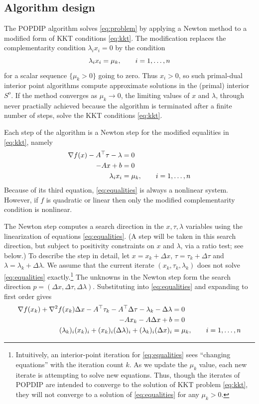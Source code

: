 \documentclass[11pt]{article}
\newcommand{\grad}{\nabla}
\begin{document}
\subsection*{Algorithm design}

The POPDIP algorithm solves \eqref{eq:problem} by applying a Newton method to a modified form of KKT conditions \eqref{eq:kkt}.  The modification replaces the complementarity condition $\lambda_i x_i = 0$ by the condition
\begin{equation}
\lambda_i x_i = \mu_k, \qquad i=1,\dots,n \notag \\
\end{equation}
for a scalar sequence $\{\mu_k>0\}$ going to zero.  Thus $x_i>0$, so such primal-dual interior point algorithms \cite{NocedalWright2006} compute approximate solutions in the (primal) interior $S^o$.  If the method converges as $\mu_k \to 0$, the limiting values of $x$ and $\lambda$, through never practially achieved because the algorithm is terminated after a finite number of steps, solve the KKT conditions \eqref{eq:kkt}.

Each step of the algorithm is a Newton step for the modified equalities in \eqref{eq:kkt}, namely
\begin{align}
\grad f(x) - A^\top \tau - \lambda &= 0 \label{eq:equalities} \\
-A x + b &= 0 \notag \\
\lambda_i x_i &= \mu_k, \qquad i=1,\dots,n \notag
\end{align}
Because of its third equation, \eqref{eq:equalities} is always a nonlinear system.  However, if $f$ is quadratic or linear then only the modified complementarity condition is nonlinear.

The Newton step computes a search direction in the $x,\tau,\lambda$ variables using the linearization of equations \eqref{eq:equalities}.  (A step will be taken in this search direction, but subject to positivity constraints on $x$ and $\lambda$, via a ratio test; see below.)  To describe the step in detail, let $x=x_k+\Delta x$, $\tau=\tau_k+\Delta\tau$ and $\lambda=\lambda_k+\Delta\lambda$.  We assume that the current iterate $(x_k,\tau_k,\lambda_k)$ does not solve \eqref{eq:equalities} exactly.\footnote{Intuitively, an interior-point iteration for \eqref{eq:equalities} sees ``changing equations'' with the iteration count $k$.  As we update the $\mu_k$ value, each new iterate is attempting to solve new equations.  Thus, though the iterates of POPDIP are intended to converge to the solution of KKT problem \eqref{eq:kkt}, they will not converge to a solution of \eqref{eq:equalities} for any $\mu_k>0$.}  The unknowns in the Newton step form the search direction $p=(\Delta x,\Delta\tau,\Delta\lambda)$.  Substituting into \eqref{eq:equalities} and expanding to first order gives
\begin{align}
\grad f(x_k) + \grad^2 f(x_k) \Delta x - A^\top \tau_k - A^\top \Delta \tau - \lambda_k - \Delta \lambda &= 0 \label{eq:prenewtonstep} \\
-A x_k - A \Delta x + b &= 0 \notag \\
(\lambda_k)_i (x_k)_i + (x_k)_i (\Delta\lambda)_i + (\lambda_k)_i (\Delta x)_i &= \mu_k, \qquad i=1,\dots,n \notag
\end{align}
\end{document}
